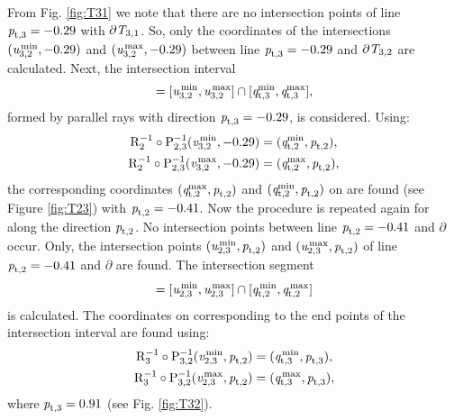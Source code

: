  From Fig. \ref{fig:T31} we note that there are no intersection points
   of line $\textit{p}_{\textrm{t,} \textit{$3$}}=-0.29$ with $\partial\mbox{$\emph{T}_{\textit{$3$,$1$}}$}$.
  So, only the coordinates of the intersections $(\textit{u}_{3, 2}^\textrm{\,min}, -0.29)$ and $(\textit{u}_{3, 2}^\textrm{\,max}, -0.29)$ between line $\textit{p}_{\textrm{t,} \textit{$3$}}=-0.29$ and  $\partial\mbox{$\emph{T}_{\textit{$3$,$2$}}$}$ are calculated.
  Next, the intersection interval 
\begin{equation}
[\variabile{v}_{3, 2}^\textrm{\,min},\variabile{v}_{3, 2}^\textrm{\,max}] = [\variabile{u}_{3, 2}^\textrm{\,min}, \variabile{u}_{3, 2}^\textrm{\,max}] \cap [\pos{t,}{$3$}^{\textrm{min}}, \pos{t,}{$3$}^{\textrm{max}}],
\end{equation} formed by parallel rays with direction $\textit{p}_{\textrm{t,} \textit{$3$}} = -0.29$, is considered.
  Using: 
\begin{equation}
\begin{split}
 \mathrm{R}_{{2}}^{-1}\circ\mathrm{P}_{{2,3}}^{-1}(\textit{v}_{3, 2}^\textrm{\,min},-0.29) & = (\textit{q}_{\textrm{t,} \textit{$2$}}^{\textrm{min}}, \textit{p}_{\textrm{t,} \textit{$2$}}),\\
 \mathrm{R}_{{2}}^{-1}\circ\mathrm{P}_{{2,3}}^{-1}(\textit{v}_{3, 2}^\textrm{\,max},-0.29) & = (\textit{q}_{\textrm{t,} \textit{$2$}}^{\textrm{max}}, \textit{p}_{\textrm{t,} \textit{$2$}}),\\
\end{split}
\end{equation}
  the corresponding coordinates $(\textit{q}_{\textrm{t,} \textit{$2$}}^{\textrm{max}}, \textit{p}_{\textrm{t,} \textit{$2$}})$ and $(\textit{q}_{\textrm{t,} \textit{$2$}}^{\textrm{min}}, \textit{p}_{\textrm{t,} \textit{$2$}})$ on  are found (see Figure \ref{fig:T23})
  with $\textit{p}_{\textrm{t,} \textit{$2$}}=-0.41$.
  Now the procedure is repeated again for  along the direction $\textit{p}_{\textrm{t,} \textit{$2$}}$.
  No intersection points between line $\textit{p}_{\textrm{t,} \textit{$2$}}=-0.41$ and $\partial$ occur. 
Only, the intersection points $(\textit{u}_{2,3}^\textrm{\,min},\textit{p}_{\textrm{t,} \textit{$2$}})$ and $(\textit{u}_{2,3}^\textrm{\,max},\textit{p}_{\textrm{t,} \textit{$2$}})$
  of line $\textit{p}_{\textrm{t,} \textit{$2$}}=-0.41$ and $\partial$ are found.
  The intersection segment 
\begin{equation}
[\variabile{v}_{2,3}^\textrm{\,min},\variabile{v}_{2,3}^\textrm{\,max}] = [\variabile{u}_{2,3}^\textrm{\,min},\variabile{u}_{2,3}^\textrm{\,max}] \cap  [\pos{t,}{$2$}^\textrm{\,min},\pos{t,}{$2$}^\textrm{\,max}]
\end{equation}
is calculated. 
The coordinates on  corresponding to the end points of the intersection interval are found using:
\begin{equation}
\begin{split}
\mathrm{R}_{{3}}^{-1}\circ\mathrm{P}_{{3,2}}^{-1} (\textit{v}_{2,3}^\textrm{\,min},\textit{p}_{\textrm{t,} \textit{$2$}})& = (\textit{q}_{\textrm{t,} \textit{$3$}}^\textrm{\,min},\textit{p}_{\textrm{t,} \textit{$3$}}),\\
\mathrm{R}_{{3}}^{-1}\circ\mathrm{P}_{{3,2}}^{-1} (\textit{v}_{2,3}^\textrm{\,max},\textit{p}_{\textrm{t,} \textit{$2$}})& = (\textit{q}_{\textrm{t,} \textit{$3$}}^\textrm{\,max},\textit{p}_{\textrm{t,} \textit{$3$}}),
\end{split}
\end{equation}  where $ \textit{p}_{\textrm{t,} \textit{$3$}} = 0.91$ (see Fig. \ref{fig:T32}). \\ \indent
